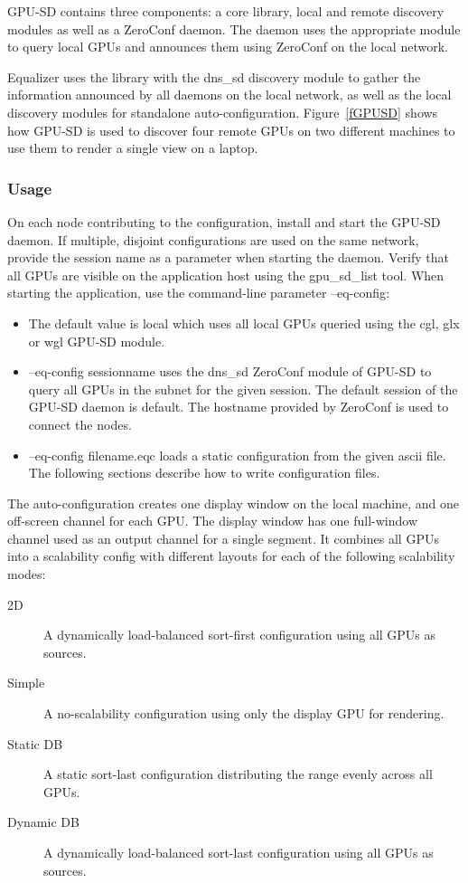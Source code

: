 \documentclass[10pt,a4]{scrartcl}
\newcommand{\fig}[1]{Figure~\ref{#1}}
\begin{document}
GPU-SD contains three components: a core library, local and remote discovery
modules as well as a ZeroConf daemon. The daemon uses the appropriate module to
query local GPUs and announces them using ZeroConf on the local network.

Equalizer uses the library with the dns\_sd discovery module to gather the
information announced by all daemons on the local network, as well as the local
discovery modules for standalone auto-configuration. \fig{fGPUSD} shows how
GPU-SD is used to discover four remote GPUs on two different machines to use
them to render a single view on a laptop.

\subsubsection{\label{sGPUSDUsage}Usage}

On each node contributing to the configuration, install and start the GPU-SD
daemon. If multiple, disjoint configurations are used on the same network,
provide the session name as a parameter when starting the daemon. Verify that
all GPUs are visible on the application host using the \textsf{gpu\_sd\_list}
tool. When starting the application, use the command-line parameter
\textsf{--eq-config}:

\begin{itemize}
\item The default value is \textsf{local} which uses all local GPUs queried
  using the cgl, glx or wgl GPU-SD module.
\item \textsf{--eq-config sessionname} uses the dns\_sd ZeroConf module of
  GPU-SD to query all GPUs in the subnet for the given session. The default
  session of the GPU-SD daemon is \textsf{default}. The hostname provided by
  ZeroConf is used to connect the nodes.
\item \textsf{--eq-config filename.eqc} loads a static configuration from the
  given ascii file. The following sections describe how to write configuration
  files.
\end{itemize}

The auto-configuration creates one display window on the local machine, and one
off-screen channel for each GPU. The display window has one full-window channel
used as an output channel for a single segment. It combines all GPUs into a
scalability config with different layouts for each of the following scalability
modes:

\begin{description}
\item [2D] A dynamically load-balanced sort-first configuration using all GPUs
  as sources.
\item [Simple] A no-scalability configuration using only the display GPU for
  rendering.
\item [Static DB] A static sort-last configuration distributing the range evenly
  across all GPUs.
\item [Dynamic DB] A dynamically load-balanced sort-last configuration using all
  GPUs as sources.
\end{description}
\end{document}
